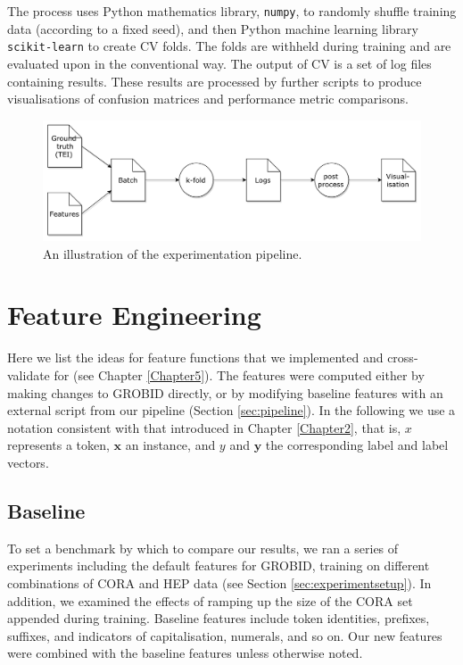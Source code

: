 The process uses Python mathematics library, \texttt{numpy}, to randomly shuffle training data (according to a fixed seed), and then Python machine learning library \texttt{scikit-learn} to create CV folds. The folds are withheld during training and are evaluated upon in the conventional way. The output of CV is a set of log files containing results. These results are processed by further scripts to produce visualisations of confusion matrices and performance metric comparisons.

\begin{figure}[!ht]
\center
\includegraphics[width=\textwidth]{Figures/pipeline.pdf}
\caption{An illustration of the experimentation pipeline.}
\label{fig:pipeline}
\end{figure}

\section{Feature Engineering}
\label{sec:featurengineering}

Here we list the ideas for feature functions that we implemented and cross-validate for (see Chapter \ref{Chapter5}). The features were computed either by making changes to GROBID directly, or by modifying baseline features with an external script from our pipeline (Section \ref{sec:pipeline}). In the following we use a notation consistent with that introduced in Chapter \ref{Chapter2}, that is, $x$ represents a token, $\mathbf{x}$ an instance, and $y$ and $\textbf{y}$ the corresponding label and label vectors.

\subsection{Baseline}

To set a benchmark by which to compare our results, we ran a series of experiments including the default features for GROBID, training on different combinations of CORA and HEP data (see Section \ref{sec:experimentsetup}). In addition, we examined the effects of ramping up the size of the CORA set appended during training. Baseline features include token identities, prefixes, suffixes, and indicators of capitalisation, numerals, and so on. Our new features were combined with the baseline features unless otherwise noted.

